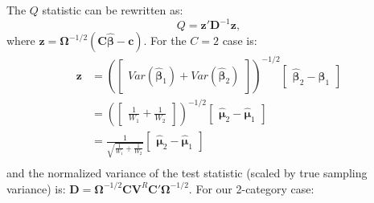  The $Q$ statistic can be rewritten as: 
 \begin{equation}
     Q = \mathbf{z}'\mathbf{D}^{-1}\mathbf{z}, 
     \nonumber
 \end{equation}
 where $\mathbf{z = \mathbf{\Omega}}^{-1/2}(\mathbf{C}\bm{\hat{\beta}}-\mathbf{c}) $. For the $C=2$ case is: 
 \begin{equation}
    \begin{split}
     \mathbf{z} &= \left(\begin{bmatrix}
          Var(\bm{\hat{\beta}}_1) + Var(\bm{\hat{\beta}}_2) 
    \end{bmatrix} \right)^{-1/2} \begin{bmatrix}
         \bm{\hat{\beta}}_2 - \bm{\hat{\beta}}_1 
     \end{bmatrix}   \\
     &= \left(\begin{bmatrix}
          \frac{1}{W_1} + \frac{1}{W_2}
    \end{bmatrix} \right)^{-1/2} \begin{bmatrix}
         \bm{\hat{\mu}}_2 - \bm{\hat{\mu}}_1 
     \end{bmatrix}   \\
     &= \frac{1}{\sqrt{\frac{1}{W_1} + \frac{1}{W_2}}} \begin{bmatrix}
         \bm{\hat{\mu}}_2 - \bm{\hat{\mu}}_1 
     \end{bmatrix}   \\
    \end{split}
     \nonumber
 \end{equation}
and the normalized variance of the test statistic (scaled by true sampling variance) is:  $\mathbf{D} = \mathbf{\Omega}^{-1/2}\mathbf{C}\mathbf{V}^R\mathbf{C}'\mathbf{\Omega}^{-1/2}$. For our 2-category case: 
